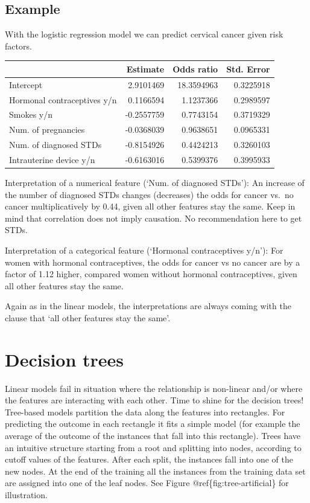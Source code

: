 \documentclass[12pt,]{krantz}
\theoremstyle{definition}
\theoremstyle{definition}
\theoremstyle{definition}
\theoremstyle{remark}
\begin{document}
\subsection{Example}\label{example}

With the logistic regression model we can predict cervical cancer given
risk factors.

\begin{tabular}{l|r|r|r}
\hline
  & Estimate & Odds ratio & Std. Error\\
\hline
Intercept & 2.9101469 & 18.3594963 & 0.3225918\\
\hline
Hormonal contraceptives y/n & 0.1166594 & 1.1237366 & 0.2989597\\
\hline
Smokes y/n & -0.2557759 & 0.7743154 & 0.3719329\\
\hline
Num. of pregnancies & -0.0368039 & 0.9638651 & 0.0965331\\
\hline
Num. of diagnosed STDs & -0.8154926 & 0.4424213 & 0.3260103\\
\hline
Intrauterine device y/n & -0.6163016 & 0.5399376 & 0.3995933\\
\hline
\end{tabular}

Interpretation of a numerical feature (`Num. of diagnosed STDs'): An
increase of the number of diagnosed STDs changes (decreases) the odds
for cancer vs.~no cancer multiplicatively by 0.44, given all other
features stay the same. Keep in mind that correlation does not imply
causation. No recommendation here to get STDs.

Interpretation of a categorical feature (`Hormonal contraceptives y/n'):
For women with hormonal contraceptives, the odds for cancer vs no cancer
are by a factor of 1.12 higher, compared women without hormonal
contraceptives, given all other features stay the same.

Again as in the linear models, the interpretations are always coming
with the clause that `all other features stay the same'.

\section{Decision trees}\label{decision-trees}

Linear models fail in situation where the relationship is non-linear
and/or where the features are interacting with each other. Time to shine
for the decision trees! Tree-based models partition the data along the
features into rectangles. For predicting the outcome in each rectangle
it fits a simple model (for example the average of the outcome of the
instances that fall into this rectangle). Trees have an intuitive
structure starting from a root and splitting into nodes, according to
cutoff values of the features. After each split, the instances fall into
one of the new nodes. At the end of the training all the instances from
the training data set are assigned into one of the leaf nodes. See
Figure @ref\{fig:tree-artificial\} for illustration.
\end{document}
